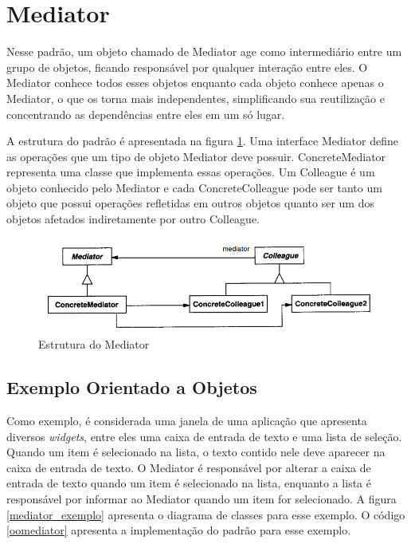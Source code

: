 \section{Mediator}


Nesse padrão, um objeto chamado de Mediator age como intermediário 
entre um grupo de objetos, ficando responsável por qualquer 
interação entre eles. O Mediator conhece todos 
esses objetos enquanto cada objeto conhece apenas o 
Mediator, o que os torna 
mais independentes, simplificando sua reutilização
 e concentrando as dependências entre eles 
em um só lugar. 

A estrutura do padrão é apresentada na figura \ref{mediator_struct}. 
Uma interface Mediator define as operações que um tipo de 
objeto Mediator deve possuir. ConcreteMediator representa 
uma classe que implementa essas operações. Um Colleague 
é um objeto conhecido pelo Mediator e cada ConcreteColleague 
pode ser tanto um objeto que possui operações refletidas 
em outros objetos quanto ser um dos objetos afetados 
indiretamente por outro Colleague.

\begin{figure}[htb]
	\caption{\label{mediator_struct}Estrutura do Mediator}
	\begin{center}
	    \includegraphics[scale=0.5]{5_padroes-contexto-funcional/5.3_comportamentais/5.3.05_mediator/diagram.png}
	\end{center}
\end{figure}



\subsection*{Exemplo Orientado a Objetos}

Como exemplo, é considerada uma janela de uma aplicação 
que apresenta diversos \textit{widgets}, entre eles uma caixa 
de entrada de texto e uma lista de seleção. Quando um item é 
selecionado na lista, o texto contido nele deve aparecer 
na caixa de entrada de texto. O Mediator é responsável 
por alterar a caixa de entrada de texto quando um item 
é selecionado na lista, enquanto a lista é responsável 
por informar ao Mediator quando um item for selecionado. 
A figura \ref{mediator_exemplo} apresenta o diagrama 
de classes para esse exemplo. O código \ref{oomediator} 
apresenta a implementação do padrão para esse exemplo.

